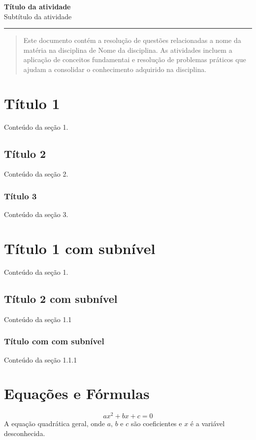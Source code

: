 \documentclass[11pt,letterpaper]{article}
\begin{document}



\begin{center}\vspace{-1cm}
\textbf{\large Título da atividade}\\
Subtítulo da atividade \\  
\end{center}
\rule{\linewidth}{0.1mm}

\begin{abstract}
    \noindent
    
    Este documento contém a resolução de questões relacionadas a nome da matéria na disciplina de Nome da disciplina. As atividades incluem a aplicação de conceitos fundamentai e resolução de problemas práticos que ajudam a consolidar o conhecimento adquirido na disciplina. 
    
\end{abstract}

\section*{Título 1}
Conteúdo da seção 1.
\subsection*{Título 2}
Conteúdo da seção 2.
\subsubsection*{Título 3}
Conteúdo da seção 3.

\section{Título 1 com subnível}
Conteúdo da seção 1.
\subsection{Título 2 com subnível}
Conteúdo da seção 1.1
\subsubsection{Título com com subnível}
Conteúdo da seção 1.1.1
\section*{Equações e Fórmulas}
\begin{equation*} %
    \label{eq:quadratica}
    ax^2 + bx + c = 0
\end{equation*}
A equação quadrática geral, onde $a$, $b$ e $c$ são coeficientes e $x$ é a variável desconhecida.
\end{document}
